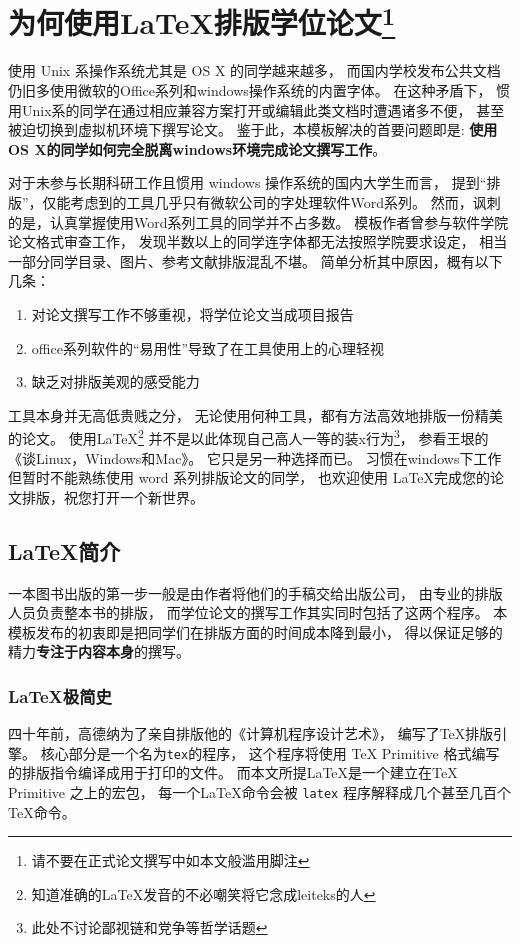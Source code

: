 
\chapter{为何使用\LaTeX 排版学位论文\footnote{请不要在正式论文撰写中如本文般滥用脚注}}

使用 Unix 系操作系统尤其是 OS X 的同学越来越多，
而国内学校发布公共文档仍旧多使用微软的Office系列和windows操作系统的内置字体。
在这种矛盾下，
惯用Unix系的同学在通过相应兼容方案打开或编辑此类文档时遭遇诸多不便，
甚至被迫切换到虚拟机环境下撰写论文。
鉴于此，本模板解决的首要问题即是:
\textbf{使用OS X的同学如何完全脱离windows环境完成论文撰写工作}。

对于未参与长期科研工作且惯用 windows 操作系统的国内大学生而言，
提到“排版”，仅能考虑到的工具几乎只有微软公司的字处理软件Word系列。
然而，讽刺的是，认真掌握使用Word系列工具的同学并不占多数。
模板作者曾参与软件学院论文格式审查工作，
发现半数以上的同学连字体都无法按照学院要求设定，
相当一部分同学目录、图片、参考文献排版混乱不堪。
简单分析其中原因，概有以下几条：
\begin{enumerate}
    \item 对论文撰写工作不够重视，将学位论文当成项目报告
    \item office系列软件的“易用性”导致了在工具使用上的心理轻视
    \item 缺乏对排版美观的感受能力
\end{enumerate}

工具本身并无高低贵贱之分，
无论使用何种工具，都有方法高效地排版一份精美的论文。
使用\LaTeX \footnote{知道准确的\LaTeX 发音的不必嘲笑将它念成leiteks的人}
并不是以此体现自己高人一等的装x行为\footnote{此处不讨论鄙视链和党争等哲学话题}，
参看王垠的《谈Linux，Windows和Mac》\cite{yinwang2013}。
它只是另一种选择而已。
习惯在windows下工作但暂时不能熟练使用 word 系列排版论文的同学，
也欢迎使用 \LaTeX 完成您的论文排版，祝您打开一个新世界。

\section{\LaTeX  简介}
一本图书出版的第一步一般是由作者将他们的手稿交给出版公司，
由专业的排版人员负责整本书的排版，
而学位论文的撰写工作其实同时包括了这两个程序。
本模板发布的初衷即是把同学们在排版方面的时间成本降到最小，
得以保证足够的精力\textbf{专注于内容本身}的撰写。

\subsection{\LaTeX 极简史}
四十年前，高德纳为了亲自排版他的《计算机程序设计艺术》，
编写了\TeX 排版引擎。
核心部分是一个名为\texttt{tex}的程序，
这个程序将使用 TeX Primitive 格式编写的排版指令编译成用于打印的文件。
而本文所提\LaTeX 是一个建立在TeX Primitive 之上的宏包，
每一个\LaTeX 命令会被 \texttt{latex} 程序解释成几个甚至几百个\TeX 命令。

